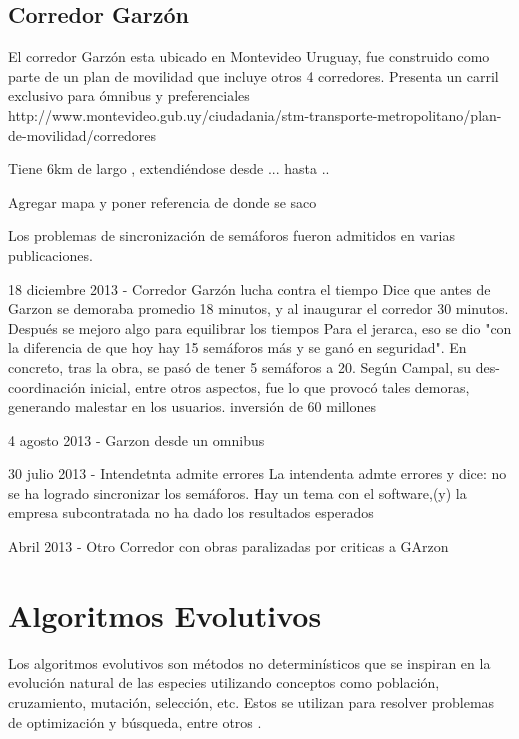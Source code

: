 \subsection{Corredor Garzón}
El corredor Garzón esta ubicado en Montevideo Uruguay, fue construido como parte de un plan de movilidad que incluye otros 4 corredores. 
Presenta un carril exclusivo para ómnibus y preferenciales
http://www.montevideo.gub.uy/ciudadania/stm-transporte-metropolitano/plan-de-movilidad/corredores

Tiene 6km de largo , extendiéndose desde ...  hasta ..

Agregar mapa y poner referencia de donde se saco

Los problemas de sincronización de semáforos fueron admitidos en varias publicaciones.

18 diciembre 2013 - Corredor Garzón lucha contra el tiempo %
Dice que antes de Garzon se demoraba promedio 18 minutos, y al inaugurar el corredor 30 minutos. Después se mejoro algo para equilibrar los tiempos
Para el jerarca, eso se dio "con la diferencia de que hoy hay 15 semáforos más y se ganó en seguridad". En concreto, tras la obra, se pasó de tener 5 semáforos a 20. Según Campal, su des-coordinación inicial, entre otros aspectos, fue lo que provocó tales demoras, generando malestar en los usuarios.
inversión de 60 millones


4 agosto 2013 - Garzon desde un omnibus %


30 julio 2013  - Intendetnta admite errores %
La intendenta admte errores y dice: no se ha logrado sincronizar los semáforos. Hay un tema con el software,(y) la empresa subcontratada no ha dado los resultados esperados


Abril 2013 - Otro Corredor con obras paralizadas por criticas a GArzon





\section{Algoritmos Evolutivos}
Los algoritmos evolutivos son métodos no determinísticos que se inspiran en la evolución natural de las especies utilizando conceptos como población, cruzamiento, mutación, selección, etc. Estos se utilizan para resolver problemas de optimización y búsqueda, entre otros \citep{Nesmachnow2002}.

